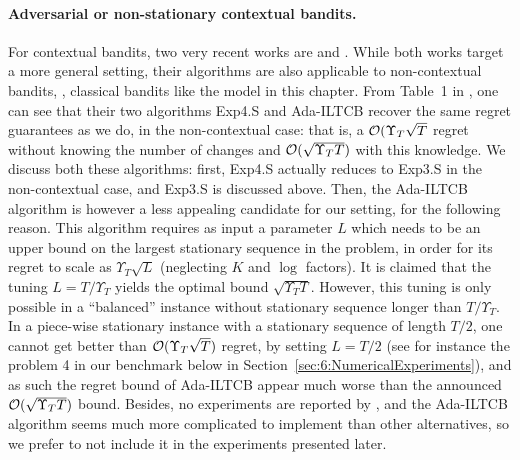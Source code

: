 \paragraph{Adversarial or non-stationary contextual bandits.}
%
For contextual bandits, two very recent works are \cite{Luo18} and \cite{ChenLeeLuoWei2019}.
While both works target a more general setting, their algorithms are also applicable to non-contextual bandits, \ie, classical bandits like the model in this chapter.
From Table~1 in \cite{Luo18}, one can see that their two algorithms Exp4.S and Ada-ILTCB recover the same regret guarantees as we do, in the non-contextual case:
that is, a $\mathcal{O}(\Upsilon_T \sqrt{T}$ regret without knowing the number of changes and $\mathcal{O}(\sqrt{\Upsilon_T T})$ with this knowledge.
We discuss both these algorithms:
%
first, Exp4.S actually reduces to Exp3.S in the non-contextual case, and Exp3.S is discussed above.
%
Then, the Ada-ILTCB algorithm is however a less appealing candidate for our setting, for the following reason.
This algorithm requires as input a parameter $L$ which needs to be an upper bound on the largest stationary sequence in the problem, in order for its regret to scale as $\Upsilon_T \sqrt{L}$ (neglecting $K$ and $\log$ factors).
It is claimed that the tuning $L=T/\Upsilon_T$ yields the optimal bound $\sqrt{\Upsilon_T T}$.
However, this tuning is only possible in a ``balanced'' instance without stationary sequence longer than $T/\Upsilon_T$.
In a piece-wise stationary instance with a stationary sequence of length $T/2$, one cannot get better than $\mathcal{O}(\Upsilon_T \sqrt{T})$ regret, by setting $L=T/2$ (see for instance the problem 4 in our benchmark below in Section~\ref{sec:6:NumericalExperiments}), and as such the regret bound of Ada-ILTCB appear much worse than the announced $\mathcal{O}(\sqrt{\Upsilon_T T})$ bound.
%
Besides, no experiments are reported by \cite{Luo18}, and the Ada-ILTCB algorithm seems much more complicated to implement than other alternatives,
so we prefer to not include it in the experiments presented later.




